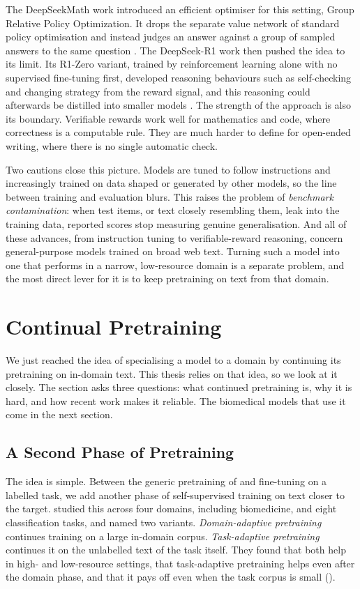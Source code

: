 The DeepSeekMath work introduced an efficient optimiser for this setting, Group
Relative Policy Optimization. It drops the separate value network of standard policy
optimisation and instead judges an answer against a group of sampled answers to the
same question \citep{shao2024deepseekmath}. The DeepSeek-R1 work then pushed the idea to its
limit. Its R1-Zero variant, trained by reinforcement learning alone with no supervised
fine-tuning first, developed reasoning behaviours such as self-checking and changing
strategy from the reward signal, and this reasoning could afterwards be distilled into
smaller models \citep{deepseek_r1_2025}. The strength of the approach is also its boundary.
Verifiable rewards work well for mathematics and code, where correctness is a computable
rule. They are much harder to define for open-ended writing, where there is no single
automatic check.

Two cautions close this picture. Models are tuned to follow instructions and
increasingly trained on data shaped or generated by other models, so the line between
training and evaluation blurs. This raises the problem of \emph{benchmark
contamination}: when test items, or text closely resembling them, leak into the
training data, reported scores stop measuring genuine generalisation. And all of these
advances, from instruction tuning to verifiable-reward reasoning, concern
general-purpose models trained on broad web text. Turning such a model into one that
performs in a narrow, low-resource domain is a separate problem, and the most direct
lever for it is to keep pretraining on text from that domain.


\section{Continual Pretraining}
\label{sec:lm-continual}

We just reached the idea of specialising a model to a domain by continuing its
pretraining on in-domain text. This thesis relies on that idea, so we look at it
closely. The section asks three questions: what continued pretraining is, why it is
hard, and how recent work makes it reliable. The biomedical models that use it come
in the next section.

\subsection{A Second Phase of Pretraining}

The idea is simple. Between the generic pretraining of  and
fine-tuning on a labelled task, we add another phase of self-supervised training on
text closer to the target. \citet{gururangan_dont_2020} studied this across four
domains, including biomedicine, and eight classification tasks, and named two
variants. \emph{Domain-adaptive pretraining} continues training on a large in-domain
corpus. \emph{Task-adaptive pretraining} continues it on the unlabelled text of the
task itself. They found that both help in high- and low-resource settings, that
task-adaptive pretraining helps even after the domain phase, and that it pays off even
when the task corpus is small ().


